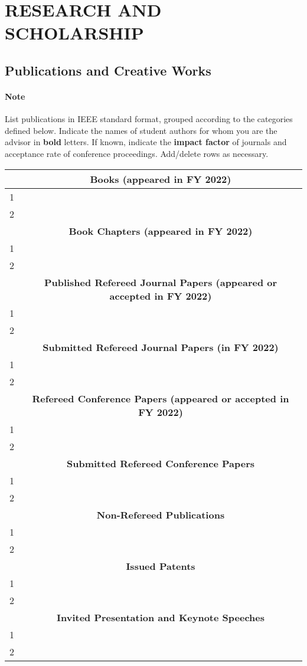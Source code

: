 \documentclass[11pt]{article}
\newcommand{\fy}{2022}
\begin{document}
\newpage

\section{RESEARCH AND SCHOLARSHIP}

\subsection{Publications and Creative Works}

\paragraph{Note} List publications in IEEE standard format, grouped according to the categories defined below. Indicate the names of student authors for whom
you are the advisor in \textbf{bold} letters. If known, indicate the
\textbf{impact factor} of journals and acceptance rate of conference
proceedings. Add/delete rows as necessary.


\begin{center}
  \begin{tabular}{cc}
    \toprule
    &\textbf{Books (appeared in FY \fy{})}\\
    \midrule
    1& \\
    2& \\
    \toprule
    &\textbf{Book Chapters (appeared in FY \fy{})}\\
    \midrule
    1& \\
    2& \\
    \toprule
    &\textbf{Published Refereed Journal Papers (appeared or accepted in FY \fy{})}\\
    \midrule
    1& \\
    2& \\
    \toprule
    &\textbf{Submitted Refereed Journal Papers (in FY \fy{})}\\
    \midrule
    1& \\
    2& \\
    \toprule
    &\textbf{Refereed Conference Papers (appeared or accepted in FY \fy{})}\\
    \midrule
    1& \\
    2& \\
    \toprule
    &\textbf{Submitted Refereed Conference Papers}\\
    \midrule
    1& \\
    2& \\
    \toprule
    &\textbf{Non-Refereed Publications}\\
    \midrule
    1& \\
    2& \\
    \toprule
    &\textbf{Issued Patents}\\
    \midrule
    1& \\
    2& \\
    \toprule
    &\textbf{Invited Presentation and Keynote Speeches}\\
    \midrule
    1& \\
    2& \\    
    \bottomrule
  \end{tabular}
\end{center}
\end{document}

